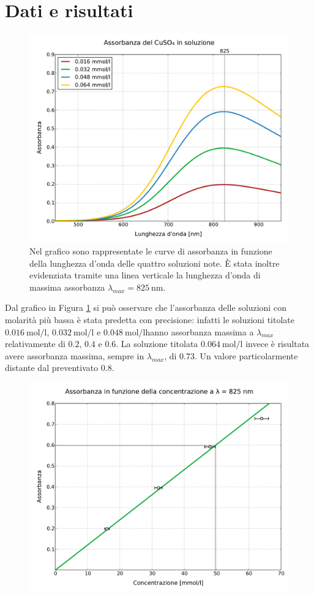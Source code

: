 \section*{Dati e risultati}

\begin{figure}
    \includegraphics[scale=0.5]{concentrazioni.pdf}
    \caption{Nel grafico sono rappresentate le curve di assorbanza in funzione della lunghezza d'onda delle quattro soluzioni note. \`E stata inoltre evidenziata tramite una linea verticale la lunghezza d'onda di massima assorbanza $\lambda_{max} = \SI{825}{\nano\meter}$.}
    \label{fig:conc}
\end{figure}

Dal grafico in Figura \ref{fig:conc} si può osservare che l'assorbanza delle soluzioni con molarità più bassa è stata predetta con precisione: infatti le soluzioni titolate $\SI{0.016}{\mole\per\litre}$, $\SI{0.032}{\mole\per\litre}$ e $\SI{0.048}{\mole\per\litre} $hanno assorbanza massima a $\lambda_{max}$ relativamente di $0.2$, $0.4$ e $0.6$. La soluzione titolata $\SI{0.064}{\mole\per\litre}$ invece è risultata avere assorbanza massima, sempre in $\lambda_{max}$, di $0.73$. Un valore particolarmente distante dal preventivato $0.8$.

\begin{figure}
    \includegraphics[scale=0.5]{retta.pdf}
    \caption{}
    \label{fig:a_vs_c}
\end{figure}

